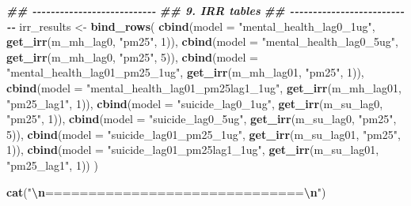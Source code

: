 \documentclass[
]{article}
\newenvironment{Shaded}{\begin{snugshade}}{\end{snugshade}}
\newcommand{\AttributeTok}[1]{\textcolor[rgb]{0.13,0.29,0.53}{#1}}
\newcommand{\DecValTok}[1]{\textcolor[rgb]{0.00,0.00,0.81}{#1}}
\newcommand{\DocumentationTok}[1]{\textcolor[rgb]{0.56,0.35,0.01}{\textbf{\textit{#1}}}}
\newcommand{\FunctionTok}[1]{\textcolor[rgb]{0.13,0.29,0.53}{\textbf{#1}}}
\newcommand{\NormalTok}[1]{#1}
\newcommand{\OtherTok}[1]{\textcolor[rgb]{0.56,0.35,0.01}{#1}}
\newcommand{\SpecialCharTok}[1]{\textcolor[rgb]{0.81,0.36,0.00}{\textbf{#1}}}
\newcommand{\StringTok}[1]{\textcolor[rgb]{0.31,0.60,0.02}{#1}}
\begin{document}
\begin{Shaded}
\begin{Highlighting}[]
\DocumentationTok{\#\# {-}{-}{-}{-}{-}{-}{-}{-}{-}{-}{-}{-}{-}{-}{-}{-}{-}{-}{-}{-}{-}{-}{-}{-}{-}{-}{-}}
\DocumentationTok{\#\# 9. IRR tables}
\DocumentationTok{\#\# {-}{-}{-}{-}{-}{-}{-}{-}{-}{-}{-}{-}{-}{-}{-}{-}{-}{-}{-}{-}{-}{-}{-}{-}{-}{-}{-}}
\NormalTok{irr\_results }\OtherTok{\textless{}{-}} \FunctionTok{bind\_rows}\NormalTok{(}
  \FunctionTok{cbind}\NormalTok{(}\AttributeTok{model =} \StringTok{"mental\_health\_lag0\_1ug"}\NormalTok{, }\FunctionTok{get\_irr}\NormalTok{(m\_mh\_lag0, }\StringTok{"pm25"}\NormalTok{, }\DecValTok{1}\NormalTok{)),}
  \FunctionTok{cbind}\NormalTok{(}\AttributeTok{model =} \StringTok{"mental\_health\_lag0\_5ug"}\NormalTok{, }\FunctionTok{get\_irr}\NormalTok{(m\_mh\_lag0, }\StringTok{"pm25"}\NormalTok{, }\DecValTok{5}\NormalTok{)),}
  \FunctionTok{cbind}\NormalTok{(}\AttributeTok{model =} \StringTok{"mental\_health\_lag01\_pm25\_1ug"}\NormalTok{, }\FunctionTok{get\_irr}\NormalTok{(m\_mh\_lag01, }\StringTok{"pm25"}\NormalTok{, }\DecValTok{1}\NormalTok{)),}
  \FunctionTok{cbind}\NormalTok{(}\AttributeTok{model =} \StringTok{"mental\_health\_lag01\_pm25lag1\_1ug"}\NormalTok{, }\FunctionTok{get\_irr}\NormalTok{(m\_mh\_lag01, }\StringTok{"pm25\_lag1"}\NormalTok{, }\DecValTok{1}\NormalTok{)),}
  \FunctionTok{cbind}\NormalTok{(}\AttributeTok{model =} \StringTok{"suicide\_lag0\_1ug"}\NormalTok{, }\FunctionTok{get\_irr}\NormalTok{(m\_su\_lag0, }\StringTok{"pm25"}\NormalTok{, }\DecValTok{1}\NormalTok{)),}
  \FunctionTok{cbind}\NormalTok{(}\AttributeTok{model =} \StringTok{"suicide\_lag0\_5ug"}\NormalTok{, }\FunctionTok{get\_irr}\NormalTok{(m\_su\_lag0, }\StringTok{"pm25"}\NormalTok{, }\DecValTok{5}\NormalTok{)),}
  \FunctionTok{cbind}\NormalTok{(}\AttributeTok{model =} \StringTok{"suicide\_lag01\_pm25\_1ug"}\NormalTok{, }\FunctionTok{get\_irr}\NormalTok{(m\_su\_lag01, }\StringTok{"pm25"}\NormalTok{, }\DecValTok{1}\NormalTok{)),}
  \FunctionTok{cbind}\NormalTok{(}\AttributeTok{model =} \StringTok{"suicide\_lag01\_pm25lag1\_1ug"}\NormalTok{, }\FunctionTok{get\_irr}\NormalTok{(m\_su\_lag01, }\StringTok{"pm25\_lag1"}\NormalTok{, }\DecValTok{1}\NormalTok{))}
\NormalTok{)}

\FunctionTok{cat}\NormalTok{(}\StringTok{"}\SpecialCharTok{\textbackslash{}n}\StringTok{==============================}\SpecialCharTok{\textbackslash{}n}\StringTok{"}\NormalTok{)}
\end{Highlighting}
\end{Shaded}
\end{document}
